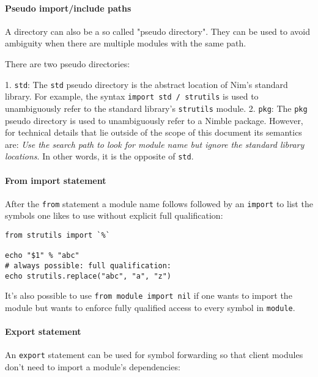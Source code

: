 \hypertarget{pseudo-importinclude-paths}{%
\paragraph{Pseudo import/include
paths}\label{pseudo-importinclude-paths}}

A directory can also be a so called "pseudo directory". They can be used
to avoid ambiguity when there are multiple modules with the same path.

There are two pseudo directories:

1. \texttt{std}: The \texttt{std} pseudo directory is the abstract
location of Nim's standard library. For example, the syntax
\texttt{import\ std\ /\ strutils} is used to unambiguously refer to the
standard library's \texttt{strutils} module. 2. \texttt{pkg}: The
\texttt{pkg} pseudo directory is used to unambiguously refer to a Nimble
package. However, for technical details that lie outside of the scope of
this document its semantics are: \emph{Use the search path to look for
module name but ignore the standard library locations}. In other words,
it is the opposite of \texttt{std}.

\hypertarget{from-import-statement}{%
\paragraph{From import statement}\label{from-import-statement}}

After the \texttt{from} statement a module name follows followed by an
\texttt{import} to list the symbols one likes to use without explicit
full qualification:

\begin{verbatim}
from strutils import `%`

echo "$1" % "abc"
# always possible: full qualification:
echo strutils.replace("abc", "a", "z")
\end{verbatim}

It's also possible to use \texttt{from\ module\ import\ nil} if one
wants to import the module but wants to enforce fully qualified access
to every symbol in \texttt{module}.

\hypertarget{export-statement}{%
\paragraph{Export statement}\label{export-statement}}

An \texttt{export} statement can be used for symbol forwarding so that
client modules don't need to import a module's dependencies:

